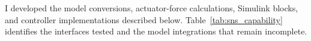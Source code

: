 I developed the model conversions, actuator-force calculations, Simulink blocks, and controller implementations described below. Table~\ref{tab:sns_capability} identifies the interfaces tested and the model integrations that remain incomplete.
